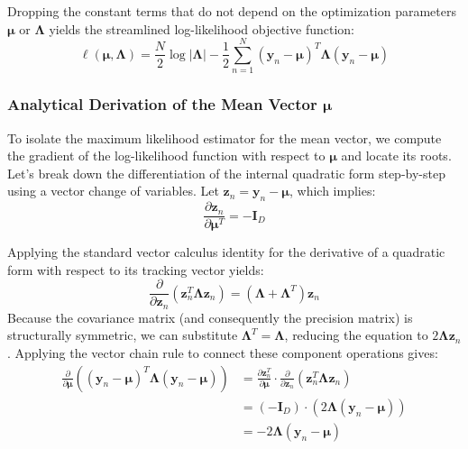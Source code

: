 \documentclass{article}
\begin{document}
Dropping the constant terms that do not depend on the optimization parameters $\boldsymbol{\mu}$ or $\boldsymbol{\Lambda}$ yields the streamlined log-likelihood objective function:
\begin{equation}
\ell(\boldsymbol{\mu}, \boldsymbol{\Lambda}) = \frac{N}{2} \log |\boldsymbol{\Lambda}| - \frac{1}{2} \sum_{n=1}^N (\mathbf{y}_n - \boldsymbol{\mu})^T \boldsymbol{\Lambda} (\mathbf{y}_n - \boldsymbol{\mu})
\end{equation}

\subsubsection{Analytical Derivation of the Mean Vector $\boldsymbol{\mu}$}

To isolate the maximum likelihood estimator for the mean vector, we compute the gradient of the log-likelihood function with respect to $\boldsymbol{\mu}$ and locate its roots. Let's break down the differentiation of the internal quadratic form step-by-step using a vector change of variables. Let $\mathbf{z}_n = \mathbf{y}_n - \boldsymbol{\mu}$, which implies:
\begin{equation}
\frac{\partial \mathbf{z}_n}{\partial \boldsymbol{\mu}^T} = -\mathbf{I}_D
\end{equation}

Applying the standard vector calculus identity for the derivative of a quadratic form with respect to its tracking vector yields:
\begin{equation}
\frac{\partial}{\partial \mathbf{z}_n} \left( \mathbf{z}_n^T \boldsymbol{\Lambda} \mathbf{z}_n \right) = (\boldsymbol{\Lambda} + \boldsymbol{\Lambda}^T)\mathbf{z}_n
\end{equation}
Because the covariance matrix (and consequently the precision matrix) is structurally symmetric, we can substitute $\boldsymbol{\Lambda}^T = \boldsymbol{\Lambda}$, reducing the equation to $2\boldsymbol{\Lambda}\mathbf{z}_n$. Applying the vector chain rule to connect these component operations gives:
\begin{align*}
\frac{\partial}{\partial \boldsymbol{\mu}} \left( (\mathbf{y}_n - \boldsymbol{\mu})^T \boldsymbol{\Lambda} (\mathbf{y}_n - \boldsymbol{\mu}) \right) &= \frac{\partial \mathbf{z}_n^T}{\partial \boldsymbol{\mu}} \cdot \frac{\partial}{\partial \mathbf{z}_n} \left( \mathbf{z}_n^T \boldsymbol{\Lambda} \mathbf{z}_n \right) \\
&= (-\mathbf{I}_D) \cdot \left( 2\boldsymbol{\Lambda}(\mathbf{y}_n - \boldsymbol{\mu}) \right) \\
&= -2\boldsymbol{\Lambda}(\mathbf{y}_n - \boldsymbol{\mu})
\end{align*}
\end{document}
